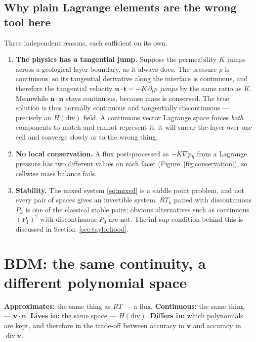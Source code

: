 \documentclass[11pt,a4paper]{article}
\newcommand{\Hdiv}{H(\mathrm{div})}
\newcommand{\dv}{\operatorname{div}}
\newcommand{\bn}{\mathbf{n}}
\newcommand{\bt}{\mathbf{t}}
\newcommand{\bu}{\mathbf{u}}
\newcommand{\bv}{\mathbf{v}}
\begin{document}
\subsection{Why plain Lagrange elements are the wrong tool here}

Three independent reasons, each sufficient on its own.

\begin{enumerate}
\item \textbf{The physics has a tangential jump.} Suppose the permeability $K$
  jumps across a geological layer boundary, as it always does. The pressure $p$
  is continuous, so its tangential derivative along the interface is continuous,
  and therefore the tangential velocity $\bu\cdot\bt = -K\,\partial_t p$
  \emph{jumps} by the same ratio as $K$. Meanwhile $\bu\cdot\bn$ stays
  continuous, because mass is conserved. The true solution is thus normally
  continuous and tangentially discontinuous --- precisely an $\Hdiv$ field. A
  continuous vector Lagrange space forces \emph{both} components to match and
  cannot represent it; it will smear the layer over one cell and converge
  slowly or to the wrong thing.
\item \textbf{No local conservation.} A flux post-processed as $-K\nabla p_h$
  from a Lagrange pressure has two different values on each facet
  (Figure~\ref{fig:conservation}), so cellwise mass balance fails.
\item \textbf{Stability.} The mixed system \eqref{eq:mixed} is a saddle point
  problem, and not every pair of spaces gives an invertible system. $RT_k$
  paired with discontinuous $P_k$ is one of the classical stable pairs; obvious
  alternatives such as continuous $(P_1)^2$ with discontinuous $P_0$ are not.
  The inf-sup condition behind this is discussed in
  Section~\ref{sec:taylorhood}.
\end{enumerate}

\FloatBarrier

\section{BDM: the same continuity, a different polynomial space}

\begin{keypoint}[cHdiv]
\textbf{Approximates:} the same thing as $RT$ --- a flux.\quad
\textbf{Continuous:} the same thing --- $\bv\cdot\bn$.\quad
\textbf{Lives in:} the same space --- $\Hdiv$.\quad
\textbf{Differs in:} which polynomials are kept, and therefore in the trade-off
between accuracy in $\bv$ and accuracy in $\dv\bv$.
\end{keypoint}
\end{document}
